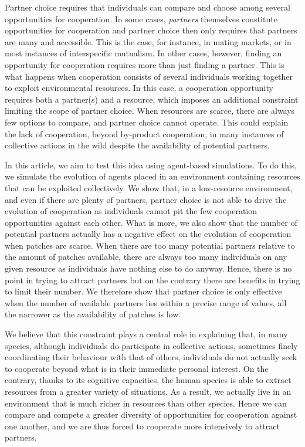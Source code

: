 \documentclass[twocolumn]{article}
\begin{document}
Partner choice requires that individuals can compare and choose among several opportunities for cooperation. In some cases, \textit{partners} themselves constitute opportunities for cooperation and partner choice then only requires that partners are many and accessible. This is the case, for instance, in mating markets, or in most instances of interspecific mutualism. In other cases, however, finding an opportunity for cooperation requires more than just finding a partner. This is what happens when cooperation consists of several individuals working together to exploit environmental resources. In this case, a cooperation opportunity requires both a partner(s) and a resource, which imposes an additional constraint limiting the scope of partner choice. When resources are scarce, there are always few options to compare, and partner choice cannot operate. This could explain the lack of cooperation, beyond by-product cooperation, in many instances of collective actions in the wild despite the availability of potential partners.

In this article, we aim to test this idea using agent-based simulations. To do this, we simulate the evolution of agents placed in an environment containing resources that can be exploited collectively. We show that, in a low-resource environment, and even if there are plenty of partners, partner choice is not able to drive the evolution of cooperation as individuals cannot pit the few cooperation opportunities against each other. What is more, we also show that the number of potential partners actually has a negative effect on the evolution of cooperation when patches are scarce. When there are too many potential partners relative to the amount of patches available, there are always too many individuals on any given resource as individuals have nothing else to do anyway. Hence, there is no point in trying to attract partners but on the contrary there are benefits in trying to limit their number. We therefore show that partner choice is only effective when the number of available partners lies within a precise range of values, all the narrower as the availability of patches is low.

We believe that this constraint plays a central role in explaining that, in many species, although individuals do participate in collective actions, sometimes finely coordinating their behaviour with that of others, individuals do not actually seek to cooperate beyond what is in their immediate personal interest. On the contrary, thanks to its cognitive capacities, the human species is able to extract resources from a greater variety of situations. As a result, we actually live in an environment that is much richer in resources than other species. Hence we can compare and compete a greater diversity of opportunities for cooperation against one another, and we are thus forced to cooperate more intensively to attract partners.
\end{document}
